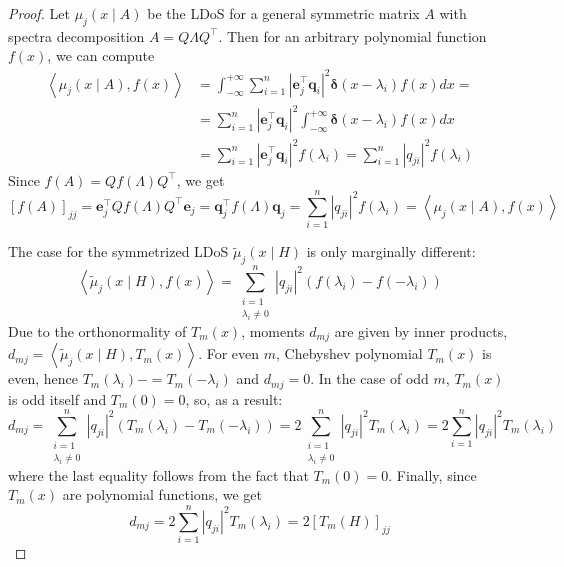 \documentclass[10pt,a4paper]{amsart}
\renewcommand*{\b}[1]{\mathbf{#1}}
\begin{document}
\begin{proof}
	Let \( \mu_j ( x \mid A )  \) be the LDoS for a general symmetric matrix $A$ with spectra decomposition \( A = Q \Lambda Q^\top \).
	Then for an arbitrary polynomial function \( f(x) \), we can compute
	\begin{align}
		\left\langle  \mu_j ( x \mid A ), f(x) \right\rangle & = \int_{-\infty}^{+\infty}  \sum_{i=1}^{n} \left| \b e_j^\top \b q_i \right|^2\bm\delta \left( x - \lambda_i \right) f(x) dx = \\
		                                                     & = \sum_{i=1}^{n} \left| \b e_j^\top \b q_i \right|^2 \int_{-\infty}^{+\infty}  \bm\delta \left( x - \lambda_i \right) f(x) dx  \\
		                                                     & =  \sum_{i=1}^{n} \left| \b e_j^\top \b q_i \right|^2 f(\lambda_i) =  \sum_{i=1}^{n} \left| q_{ji} \right|^2 f(\lambda_i)
	\end{align}
	Since \( f(A) = Q f(\Lambda) Q^\top \), we get
	\begin{equation}
		\left[ f(A) \right]_{jj} = \b e_j^\top Q f(\Lambda) Q^\top \b e_j = \b q_j^\top f(\Lambda) \b q_j = \sum_{i=1}^{n} \left| q_{ji} \right|^2 f(\lambda_i) = \left\langle  \mu_j ( x \mid A ), f(x) \right\rangle
	\end{equation}

	The case for the symmetrized LDoS \( \tilde \mu_j ( x \mid H ) \) is only marginally different:
	\begin{equation*}
		\left\langle  \tilde \mu_j ( x \mid H ), f(x) \right\rangle = \sum_{\substack{i=1   \\ \lambda_i \ne 0 }}^{n} \left| q_{ji} \right|^2 \left( f(\lambda_i) - f(-\lambda_i) \right)
	\end{equation*}
	Due to the orthonormality of \( T_m(x) \), moments \( d_{mj}\) are given by inner products, \( d_{mj} = \left\langle  \tilde \mu_j ( x \mid H ), T_m(x) \right\rangle \).
	For even \( m \), Chebyshev polynomial \( T_m(x) \) is even, hence \( T_m(\lambda_i) -= T_m(-\lambda_i)\) and \( d_{mj} = 0 \).
	In the case of odd \(m\), \( T_m(x) \) is odd itself and \( T_m(0) = 0 \), so, as a result:
	\begin{equation}
		d_{mj} = \sum_{\substack{i=1 \\ \lambda_i \ne 0 }}^{n} \left| q_{ji} \right|^2 \left( T_m(\lambda_i) - T_m(-\lambda_i) \right) =
		2 \sum_{\substack{i=1                                                                 \\ \lambda_i \ne 0 }}^{n} \left| q_{ji} \right|^2 T_m(\lambda_i) = 2 \sum_{i=1}^{n} \left| q_{ji} \right|^2 T_m(\lambda_i)
	\end{equation}
	where the last equality follows from the fact that \( T_m(0) = 0 \).
	Finally, since \( T_m(x)\) are polynomial functions, we get
	\begin{equation}
		d_{mj} = 2 \sum_{i=1}^{n} \left| q_{ji} \right|^2 T_m(\lambda_i) = 2 \left[ T_m(H) \right]_{jj}
	\end{equation}
\end{proof}
\end{document}
